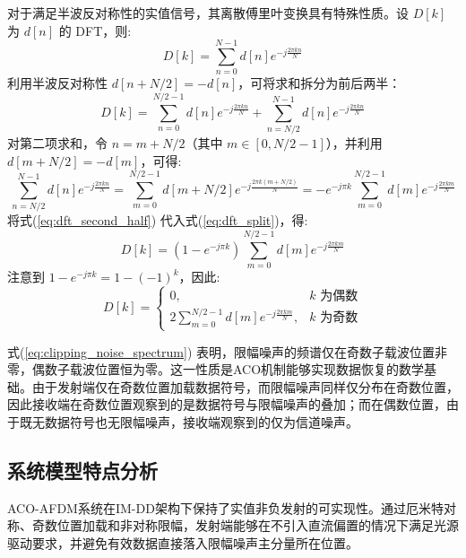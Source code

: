 对于满足半波反对称性的实值信号，其离散傅里叶变换具有特殊性质。设 $D[k]$ 为 $d[n]$ 的 DFT，则:
\begin{equation}
    D[k] = \sum_{n=0}^{N-1} d[n] e^{-j\frac{2\pi kn}{N}}
    \label{eq:dft_of_clipping_noise}
\end{equation}
利用半波反对称性 $d[n+N/2] = -d[n]$，可将求和拆分为前后两半：
\begin{equation}
    D[k] = \sum_{n=0}^{N/2-1} d[n] e^{-j\frac{2\pi kn}{N}} + \sum_{n=N/2}^{N-1} d[n] e^{-j\frac{2\pi kn}{N}}
    \label{eq:dft_split}
\end{equation}
对第二项求和，令 $n = m + N/2$（其中 $m \in [0, N/2-1]$），并利用 $d[m+N/2] = -d[m]$，可得:
\begin{equation}
    \sum_{n=N/2}^{N-1} d[n] e^{-j\frac{2\pi kn}{N}} = \sum_{m=0}^{N/2-1} d[m+N/2] e^{-j\frac{2\pi k(m+N/2)}{N}} = -e^{-j\pi k} \sum_{m=0}^{N/2-1} d[m] e^{-j\frac{2\pi km}{N}}
    \label{eq:dft_second_half}
\end{equation}
将式(\ref{eq:dft_second_half}) 代入式(\ref{eq:dft_split})，得:
\begin{equation}
    D[k] = \left(1 - e^{-j\pi k}\right) \sum_{m=0}^{N/2-1} d[m] e^{-j\frac{2\pi km}{N}}
    \label{eq:dft_simplified}
\end{equation}
注意到 $1 - e^{-j\pi k} = 1 - (-1)^k$，因此:
\begin{equation}
    D[k] = \begin{cases}
        0, & k \text{ 为偶数} \\
        2\sum_{m=0}^{N/2-1} d[m] e^{-j\frac{2\pi km}{N}}, & k \text{ 为奇数}
    \end{cases}
    \label{eq:clipping_noise_spectrum}
\end{equation}

式(\ref{eq:clipping_noise_spectrum}) 表明，限幅噪声的频谱仅在奇数子载波位置非零，偶数子载波位置恒为零。这一性质是ACO机制能够实现数据恢复的数学基础。由于发射端仅在奇数位置加载数据符号，而限幅噪声同样仅分布在奇数位置，因此接收端在奇数位置观察到的是数据符号与限幅噪声的叠加；而在偶数位置，由于既无数据符号也无限幅噪声，接收端观察到的仅为信道噪声。

\subsection{系统模型特点分析}
\label{subsec:aco_afdm_features}

ACO-AFDM系统在IM-DD架构下保持了实值非负发射的可实现性。通过厄米特对称、奇数位置加载和非对称限幅，发射端能够在不引入直流偏置的情况下满足光源驱动要求，并避免有效数据直接落入限幅噪声主分量所在位置。

